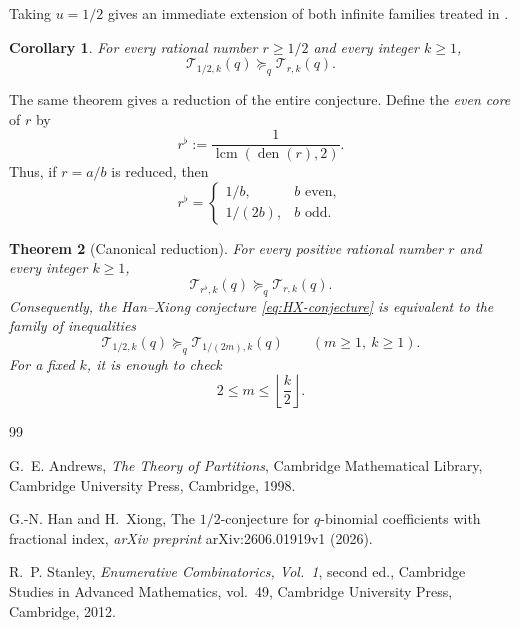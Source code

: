 \documentclass[11pt]{amsart}
\newcommand{\den}{\operatorname{den}}
\newcommand{\T}{\mathcal{T}}
\newcommand{\geqcoef}{\succeq_q}
\theoremstyle{plain}
\newtheorem{theorem}{Theorem}
\newtheorem{corollary}[theorem]{Corollary}
\theoremstyle{definition}
\begin{document}
Taking $u=1/2$ gives an immediate extension of both infinite families treated
in \cite{HanXiong}.

\begin{corollary}\label{cor:half-line}
For every rational number $r\geq 1/2$ and every integer $k\geq 1$,
\[
  \T_{1/2,k}(q)\geqcoef \T_{r,k}(q).
\]
\end{corollary}

The same theorem gives a reduction of the entire conjecture.  Define the
\emph{even core} of $r$ by
\begin{equation}\label{eq:even-core}
  r^{\flat}:=\frac{1}{\operatorname{lcm}(\den(r),2)}.
\end{equation}
Thus, if $r=a/b$ is reduced, then
\[
 r^{\flat}=
 \begin{cases}
   1/b,& b\text{ even},\\
   1/(2b),& b\text{ odd}.
 \end{cases}
\]

\begin{theorem}[Canonical reduction]\label{thm:canonical-reduction}
For every positive rational number $r$ and every integer $k\geq 1$,
\begin{equation}\label{eq:core-dominates}
  \T_{r^{\flat},k}(q)\geqcoef \T_{r,k}(q).
\end{equation}
Consequently, the Han--Xiong conjecture \eqref{eq:HX-conjecture} is equivalent
to the family of inequalities
\begin{equation}\label{eq:unit-family}
  \T_{1/2,k}(q)\geqcoef \T_{1/(2m),k}(q)
  \qquad(m\geq 1,\ k\geq 1).
\end{equation}
For a fixed $k$, it is enough to check
\begin{equation}\label{eq:finite-unit-family}
  2\leq m\leq \left\lfloor\frac{k}{2}\right\rfloor.
\end{equation}
\end{theorem}



\begin{thebibliography}{99}

G.~E. Andrews,
\emph{The Theory of Partitions},
Cambridge Mathematical Library, Cambridge University Press, Cambridge, 1998.


G.-N. Han and H.~Xiong,
The $1/2$-conjecture for $q$-binomial coefficients with fractional index,
\emph{arXiv preprint} arXiv:2606.01919v1 (2026).

R.~P. Stanley,
\emph{Enumerative Combinatorics, Vol.~1}, second ed.,
Cambridge Studies in Advanced Mathematics, vol.~49,
Cambridge University Press, Cambridge, 2012.

\end{thebibliography}
\end{document}
